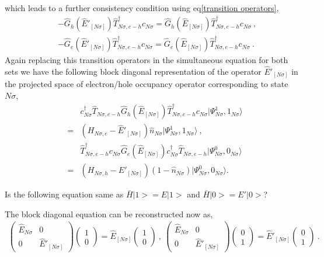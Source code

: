 \documentclass[12pt,a4paper]{article}
\begin{document}
which leads to a further consistency condition using eq\eqref{transition operators},
\begin{eqnarray}
&&-\hat{G}_{h}(\hat{E}'_{[N\sigma]})\hat{T}^{\dagger}_{N\sigma,e-h}c_{N\sigma} = \hat{G}_{h}(\hat{E}_{[N\sigma]})\hat{T}^{\dagger}_{N\sigma,e-h}c_{N\sigma}~,~\nonumber\\
&&-\hat{G}_{e}(\hat{E}'_{[N\sigma]})\hat{T}^{\dagger}_{N\sigma,e-h}c_{N\sigma} = \hat{G}_{e}(\hat{E}_{[N\sigma]})\hat{T}^{\dagger}_{N\sigma,e-h}c_{N\sigma}~.~~\label{consistency}
\end{eqnarray}
Again replacing this transition operators in the simultaneous equation for both sets we have the following block diagonal representation of the operator $\hat{E}'_{[N\sigma]}$ in the projected space of electron/hole occupancy operator corresponding to state $N\sigma$,
\begin{eqnarray}
&&c^{\dagger}_{N\sigma}\hat{T}_{N\sigma,e-h}\hat{G}_{h}(\hat{E}_{[N\sigma]})\hat{T}^{\dagger}_{N\sigma,e-h}c_{N\sigma}|\Psi^{1}_{N\sigma},1_{N\sigma}\rangle\nonumber\\
 &=& (H_{N\sigma,e}-\hat{E}'_{[N\sigma]})\hat{n}_{N\sigma}|\Psi^{1}_{N\sigma},1_{N\sigma}\rangle~,~\nonumber\\
&&\hat{T}^{\dagger}_{N\sigma,e-h}c_{N\sigma}\hat{G}_{e}(\hat{E}_{[N\sigma]})c^{\dagger}_{N\sigma}\hat{T}_{N\sigma,e-h}|\Psi^{0}_{N\sigma},0_{N\sigma}\rangle\nonumber\\
& =& (H_{N\sigma,h}-\hat{E}'_{[N\sigma]})(1-\hat{n}_{N\sigma})|\Psi^{0}_{N\sigma},0_{N\sigma}\rangle. 
\label{block_diag2}
\end{eqnarray}
\begin{tcolorbox}
Is the following equation same as \(\bar{H}| 1>=E| 1>\) and \(\bar{H}| 0>=E'| 0>\)?
\end{tcolorbox}
The block diagonal equation can be reconstructed now as,
\begin{eqnarray}
\begin{pmatrix}
\hat{E}_{N\sigma} & 0 \\
0 & \hat{E}'_{[N\sigma]}
\end{pmatrix}\begin{pmatrix}
1 \\ 0 
\end{pmatrix} = \hat{E}_{[N\sigma]} \begin{pmatrix}
1 \\ 0 
\end{pmatrix}~,~\begin{pmatrix}
\hat{E}_{N\sigma} & 0 \\
0 & \hat{E}'_{[N\sigma]}
\end{pmatrix}\begin{pmatrix}
0 \\ 1 
\end{pmatrix} = \hat{E}'_{[N\sigma]} \begin{pmatrix}
0 \\ 1 
\end{pmatrix}~.\label{block_diag_eqn}
\end{eqnarray}
\end{document}
